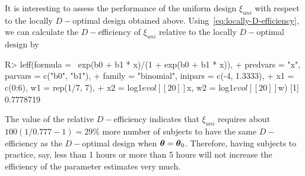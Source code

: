 It is  interesting to assess the performance of  the uniform design $\xi_{uni}$ with respect to the locally $D-$optimal design obtained above. Using~\eqref{eq:locally-D-efficiency},  we can calculate the $D-$efficiency of  $\xi_{uni}$ relative to the  locally $D-$optimal design by
\begin{example}
R> leff(formula = ~exp(b0 + b1 * x)/(1 + exp(b0 + b1 * x)),
+      predvars = "x", parvars = c("b0", "b1"),
+      family = "binomial", inipars = c(-4, 1.3333),
+      x1 = c(0:6), w1 = rep(1/7, 7),
+      x2 = log1$evol[[20]]$x, w2 = log1$evol[[20]]$w)
[1] 0.7778719
\end{example}
The value of the relative $D-$efficiency indicates  that $\xi_{uni}$ requires about $100(1/0.777-1)= 29\%$ more number of subjects to have the same $D-$efficiency  as the $D-$optimal design when $\boldsymbol{\theta} = \boldsymbol{\theta}_0$.  Therefore, having subjects to practice, say, less than 1 hours or more than 5 hours will not increase the efficiency of the parameter estimates very much. 

